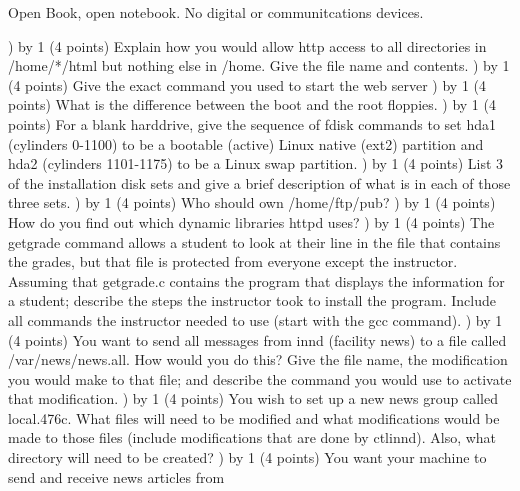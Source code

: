 
\parindent=0in
\nopagenumbers
\newcount\quesno
{}
\def\ques{\number\quesno) \advance\quesno by 1}
\def\aspace{\vskip 1.5in}

Open Book, open notebook. No digital or communitcations devices.

\ques
(4 points)
Explain how you would allow http access to all directories in
{\ltt{}/home/*/html} but nothing else in
{\ltt{}/home}.
Give the file name and contents.
\vskip 2.8in
\ques
(4 points)
Give the exact command you used to start the web server
\vskip 0.5in
\ques
(4 points)
What is the difference between the boot and the root floppies.
\vskip 1.5in
\ques
(4 points)
For a blank harddrive,
give the sequence of {\ltt{}fdisk} commands to
set {\ltt{}hda1} (cylinders 0-1100)
to be a bootable (active) Linux native (ext2) partition
and {\ltt{}hda2} (cylinders 1101-1175)
to be a Linux swap partition.
\vfill\eject
\ques
(4 points)
List 3 of the installation disk sets and give a brief description of what
is in each of those three sets.
\vskip 1.8in
\ques
(4 points)
Who should own {\ltt{}/home/ftp/pub}?
\vskip 0.5in
\ques
(4 points)
How do you find out which dynamic libraries {\ltt{}httpd} uses?
\vskip 0.5in
\ques
(4 points)
The {\ltt{}getgrade} command allows a student to look at their line
in the file that contains the grades, but that file is protected
from everyone except the instructor.
Assuming that {\ltt{}getgrade.c} contains the program that displays the
information for a student;
describe the steps the instructor took to install the program.
Include all commands the instructor needed to use
(start with the {\ltt{}gcc} command).
\vskip 1.0in
\ques
(4 points)
You want to send all messages from {\ltt{}innd} (facility {\ltt{}news})
to a file called {\ltt{}/var/news/news.all}.
How would you do this?
Give the file name, the modification you would make to that file;
and describe the command you would use to activate that modification.
\vskip 1.3in
\vfill\eject
\ques
(4 points)
You wish to set up a new news group called {\ltt{}local.476c}.
What files will need to be modified
and what modifications would be made to those files
(include modifications that are done by {\ltt{}ctlinnd}).
Also, what directory will need to be created?
\vskip 2.5in
\ques
(4 points)
You want your machine to send and receive news articles from
